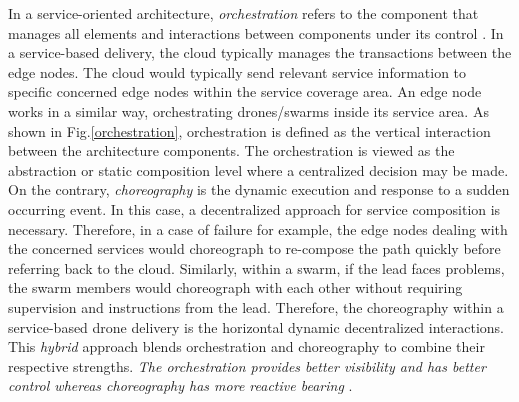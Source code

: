 \documentclass[conference]{IEEEtran}
\begin{document}
In a service-oriented architecture, \textit{orchestration} refers to the component that manages all elements and interactions between components under its control \cite{cherrier2018services}. In a service-based delivery, the cloud typically manages the transactions between the edge nodes. The cloud would typically send relevant service information to specific concerned edge nodes within the service coverage area. An edge node works in a similar way, orchestrating drones/swarms inside its service area. As shown in Fig.\ref{orchestration}, orchestration is defined as the vertical interaction between the architecture components. The orchestration is viewed as the abstraction or static composition level where a centralized decision may be made. On the contrary, \textit{choreography} is the dynamic execution and response to a sudden occurring event. In this case, a decentralized approach for service composition is necessary. Therefore, in a case of failure for example, the edge nodes dealing with the concerned services would choreograph to re-compose the path quickly before referring back to the cloud. Similarly, within a swarm, if the lead faces problems, the swarm members would choreograph with each other without requiring supervision and instructions from the lead. Therefore, the choreography within a service-based drone delivery is the horizontal dynamic decentralized interactions. This \textit{hybrid} approach blends orchestration and choreography to combine their respective strengths. \textit{The orchestration provides better visibility and has better control whereas choreography has more reactive bearing} \cite{singhal2019selection}.








\end{document}
